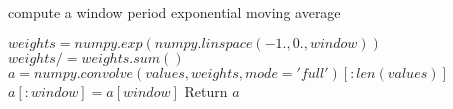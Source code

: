 \documentclass{article}
\begin{document}
	\begin{algorithm}
		\caption{compute a window period exponential moving average}
		\label{exponential-moving-average}
		\begin{algorithmic}[2]
			\State $weights = numpy.exp(numpy.linspace(-1., 0., window))$
			\State $weights /= weights.sum()$
			\State $a = numpy.convolve(values, weights, mode='full')[:len(values)]$
			\State $a[:window] = a[window]$
			\State Return $a$
			\EndProcedure
		\end{algorithmic}
	\end{algorithm}
\end{document}
